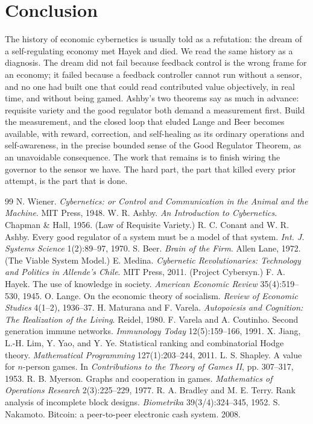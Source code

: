 \documentclass[10pt]{article}
\begin{document}
\section{Conclusion}

The history of economic cybernetics is usually told as a refutation: the dream of a self-regulating
economy met Hayek and died. We read the same history as a diagnosis. The dream did not fail because
feedback control is the wrong frame for an economy; it failed because a feedback controller cannot run
without a sensor, and no one had built one that could read contributed value objectively, in real time,
and without being gamed. Ashby's two theorems say as much in advance: requisite variety and the good
regulator both demand a measurement first. Build the measurement, and the closed loop that eluded Lange
and Beer becomes available, with reward, correction, and self-healing as its ordinary operations and
self-awareness, in the precise bounded sense of the Good Regulator Theorem, as an unavoidable consequence.
The work that remains is to finish wiring the governor to the sensor we have. The hard part, the part that
killed every prior attempt, is the part that is done.

\begin{thebibliography}{99}
\small
{} N. Wiener. \emph{Cybernetics: or Control and Communication in the Animal and the Machine}. MIT Press, 1948.
 W. R. Ashby. \emph{An Introduction to Cybernetics}. Chapman \& Hall, 1956. (Law of Requisite Variety.)
 R. C. Conant and W. R. Ashby. Every good regulator of a system must be a model of that system. \emph{Int. J. Systems Science} 1(2):89--97, 1970.
 S. Beer. \emph{Brain of the Firm}. Allen Lane, 1972. (The Viable System Model.)
 E. Medina. \emph{Cybernetic Revolutionaries: Technology and Politics in Allende's Chile}. MIT Press, 2011. (Project Cybersyn.)
 F. A. Hayek. The use of knowledge in society. \emph{American Economic Review} 35(4):519--530, 1945.
 O. Lange. On the economic theory of socialism. \emph{Review of Economic Studies} 4(1--2), 1936--37.
 H. Maturana and F. Varela. \emph{Autopoiesis and Cognition: The Realization of the Living}. Reidel, 1980.
 F. Varela and A. Coutinho. Second generation immune networks. \emph{Immunology Today} 12(5):159--166, 1991.
 X. Jiang, L.-H. Lim, Y. Yao, and Y. Ye. Statistical ranking and combinatorial Hodge theory. \emph{Mathematical Programming} 127(1):203--244, 2011.
 L. S. Shapley. A value for $n$-person games. In \emph{Contributions to the Theory of Games II}, pp. 307--317, 1953.
 R. B. Myerson. Graphs and cooperation in games. \emph{Mathematics of Operations Research} 2(3):225--229, 1977.
 R. A. Bradley and M. E. Terry. Rank analysis of incomplete block designs. \emph{Biometrika} 39(3/4):324--345, 1952.
 S. Nakamoto. Bitcoin: a peer-to-peer electronic cash system. 2008.
\end{thebibliography}
\end{document}
